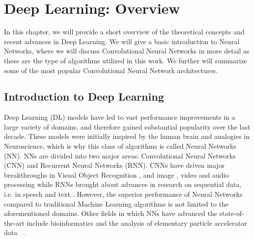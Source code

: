 
\chapter{Deep Learning: Overview} %

\label{Chapter2} %


In this chapter, we will provide a short overview of the theoretical concepts and recent advances in Deep Learning. We will give a basic introduction to Neural Networks, where we will discuss Convolutional Neural Networks in more detail as these are the type of algorithms utilized in this work. We further will summarize some of the most popular Convolutional Neural Network architectures.




\section{Introduction to Deep Learning}

Deep Learning (DL) models have led to vast performance improvements in a large variety of domains, and therefore gained substantial popularity over the last decade. These models were initially inspired by the human brain and analogies in Neuroscience, which is why this class of algorithms is called Neural Networks (NN). NNs are divided into two major areas: Convolutional Neural Networks (CNN) and Recurrent Neural Networks (RNN). CNNs have driven major breakthroughs in Visual Object Recognition \parencite{krizhevsky2012}, and image \parencite{zhang2015}, video \parencite{tompson2014} and audio \parencite{hinton2012} processing while RNNs brought about advances in research on sequential data, i.e. in speech and text \parencite{collobert2011}. However, the superior performance of Neural Networks compared to traditional Machine Learning algorithms is not limited to the aforementioned domains. Other fields in which NNs have advanced the state-of-the-art include bioinformatics \parencite{junshui2015}	 and the analysis of elementary particle accelerator data ~\parencite{ciodaroc2012}.

